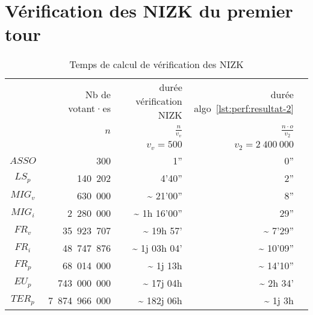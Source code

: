 \documentclass[../report]{subfiles}
\begin{document}
\section{Vérification des NIZK du premier tour}


\begin{table}[H]
	\begin{center}
		\begin{tabular}{|c|r|r|r|r|}
			\hline
			& Nb de votant·es      &   durée vérification NIZK           & durée algo~\ref{lst:perf:resultat-2}           \\
			& $n$                  & $\frac{n}{v_v}$                     & $\frac{n \cdot o}{v_2}$ \\
			\hline
			&                      & $v_v = 500$                         & $v_2 = 2~400~000$         \\
			\hline
			\hline
			$ASSO$  &           300 &                                 1''           &                            0''           \\
			$LS_p$  &       140~202 &                              4'40''           &                            2''           \\
			$MIG_v$ &       630~000 &  \textasciitilde{}          21'00''           &                            8''           \\
			$MIG_i$ &     2~280~000 &  \textasciitilde{}       1h 16'00''           &                           29''           \\
			$FR_v$  &    35~923~707 &  \textasciitilde{}      19h 57'\phantom{27''} & \textasciitilde{}       7'29''           \\
			$FR_i$  &    48~747~876 &  \textasciitilde{}   1j 03h 04'\phantom{56''} & \textasciitilde{}      10'09''           \\
			$FR_p$  &    68~014~000 &  \textasciitilde{}   1j 13h \phantom{47'08''} & \textasciitilde{}      14'10''           \\
			$EU_p$  &   743~000~000 &  \textasciitilde{}  17j 04h \phantom{46'40''} & \textasciitilde{}   2h 34'\phantom{48''} \\
			$TER_p$ & 7~874~966~000 &  \textasciitilde{} 182j 06h \phantom{58'52''} & \textasciitilde{} 1j 3h \phantom{20'37''} \\
			\hline
		\end{tabular}
	\end{center}
	\caption{Temps de calcul de vérification des NIZK}\label{tab:}
\end{table}
\end{document}

